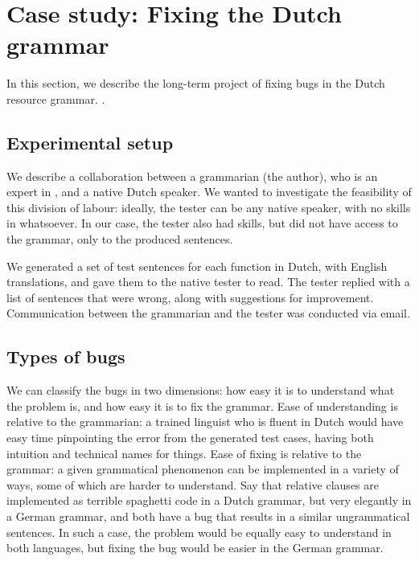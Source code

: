 \section{Case study: Fixing the Dutch grammar}
\label{dutch-experiment}

In this section, we describe the long-term project of fixing bugs in
the Dutch resource grammar. .


\subsection{Experimental setup}\label{experimental-setup}

We describe a collaboration between a grammarian (the author), who is an
expert in \gf, and a native Dutch speaker. We wanted to investigate the
feasibility of this division of labour: ideally, the tester can be any
native speaker, with no skills in \gf{} whatsoever. In our case, the tester
also had \gf{} skills, but did not have access to the grammar, only to the
produced sentences.

We generated a set of test sentences for each function in Dutch, with
English translations, and gave them to the native tester to read. The
tester replied with a list of sentences that were wrong, along with
suggestions for improvement. Communication between the grammarian and
the tester was conducted via email. 


\subsection{Types of bugs}\label{types-of-bugs}

We can classify the bugs in two dimensions: how easy it is to understand
what the problem is, and how easy it is to fix the grammar. Ease of
understanding is relative to the grammarian: a trained linguist who is
fluent in Dutch would have easy time pinpointing the error from the
generated test cases, having both intuition and technical names for
things. Ease of fixing is relative to the grammar: a given grammatical
phenomenon can be implemented in a variety of ways, some of which are
harder to understand. Say that relative clauses are implemented as
terrible spaghetti code in a Dutch grammar, but very elegantly in a
German grammar, and both have a bug that results in a similar
ungrammatical sentences. In such a case, the problem would be equally
easy to understand in both languages, but fixing the bug would be easier
in the German grammar. 

